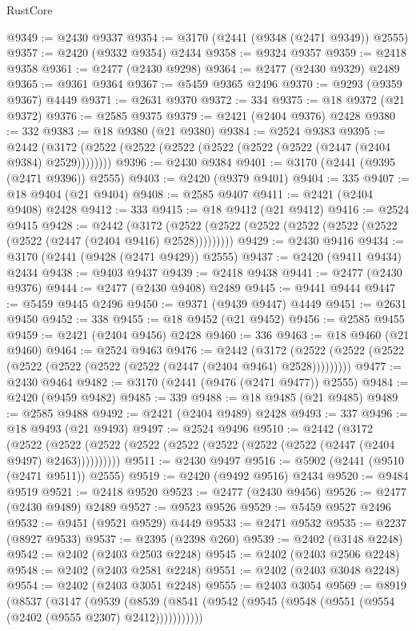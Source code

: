 \begin{lexlean}{RustCore}
\begin{coremodule}
@9349 := @2430 @9337
@9354 := @3170 (@2441 (@9348 (@2471 @9349)) @2555)
@9357 := @2420 (@9332 @9354) @2434
@9358 := @9324 @9357
@9359 := @2418 @9358
@9361 := @2477 (@2430 @9298)
@9364 := @2477 (@2430 @9329) @2489
@9365 := @9361 @9364
@9367 := @5459 @9365 @2496
@9370 := @9293 (@9359 @9367) @4449
@9371 := @2631 @9370
@9372 := 334
@9375 := @18 @9372 (@21 @9372)
@9376 := @2585 @9375
@9379 := @2421 (@2404 @9376) @2428
@9380 := 332
@9383 := @18 @9380 (@21 @9380)
@9384 := @2524 @9383
@9395 := @2442 (@3172 (@2522 (@2522 (@2522 (@2522 (@2522 (@2522 (@2447 (@2404 @9384) @2529))))))))
@9396 := @2430 @9384
@9401 := @3170 (@2441 (@9395 (@2471 @9396)) @2555)
@9403 := @2420 (@9379 @9401)
@9404 := 335
@9407 := @18 @9404 (@21 @9404)
@9408 := @2585 @9407
@9411 := @2421 (@2404 @9408) @2428
@9412 := 333
@9415 := @18 @9412 (@21 @9412)
@9416 := @2524 @9415
@9428 := @2442
    (@3172 (@2522 (@2522 (@2522 (@2522 (@2522 (@2522 (@2522 (@2447 (@2404 @9416) @2528)))))))))
@9429 := @2430 @9416
@9434 := @3170 (@2441 (@9428 (@2471 @9429)) @2555)
@9437 := @2420 (@9411 @9434) @2434
@9438 := @9403 @9437
@9439 := @2418 @9438
@9441 := @2477 (@2430 @9376)
@9444 := @2477 (@2430 @9408) @2489
@9445 := @9441 @9444
@9447 := @5459 @9445 @2496
@9450 := @9371 (@9439 @9447) @4449
@9451 := @2631 @9450
@9452 := 338
@9455 := @18 @9452 (@21 @9452)
@9456 := @2585 @9455
@9459 := @2421 (@2404 @9456) @2428
@9460 := 336
@9463 := @18 @9460 (@21 @9460)
@9464 := @2524 @9463
@9476 := @2442
    (@3172 (@2522 (@2522 (@2522 (@2522 (@2522 (@2522 (@2522 (@2447 (@2404 @9464) @2528)))))))))
@9477 := @2430 @9464
@9482 := @3170 (@2441 (@9476 (@2471 @9477)) @2555)
@9484 := @2420 (@9459 @9482)
@9485 := 339
@9488 := @18 @9485 (@21 @9485)
@9489 := @2585 @9488
@9492 := @2421 (@2404 @9489) @2428
@9493 := 337
@9496 := @18 @9493 (@21 @9493)
@9497 := @2524 @9496
@9510 := @2442
    (@3172
      (@2522 (@2522 (@2522 (@2522 (@2522 (@2522 (@2522 (@2522 (@2447 (@2404 @9497) @2463))))))))))
@9511 := @2430 @9497
@9516 := @5902 (@2441 (@9510 (@2471 @9511)) @2555)
@9519 := @2420 (@9492 @9516) @2434
@9520 := @9484 @9519
@9521 := @2418 @9520
@9523 := @2477 (@2430 @9456)
@9526 := @2477 (@2430 @9489) @2489
@9527 := @9523 @9526
@9529 := @5459 @9527 @2496
@9532 := @9451 (@9521 @9529) @4449
@9533 := @2471 @9532
@9535 := @2237 (@8927 @9533)
@9537 := @2395 (@2398 @260)
@9539 := @2402 (@3148 @2248)
@9542 := @2402 (@2403 @2503 @2248)
@9545 := @2402 (@2403 @2506 @2248)
@9548 := @2402 (@2403 @2581 @2248)
@9551 := @2402 (@2403 @3048 @2248)
@9554 := @2402 (@2403 @3051 @2248)
@9555 := @2403 @3054
@9569 := @8919
    (@8537
      (@3147
        (@9539
          (@8539 (@8541 (@9542 (@9545 (@9548 (@9551 (@9554 (@2402 (@9555 @2307) @2412)))))))))))

\end{coremodule}
\end{lexlean}
